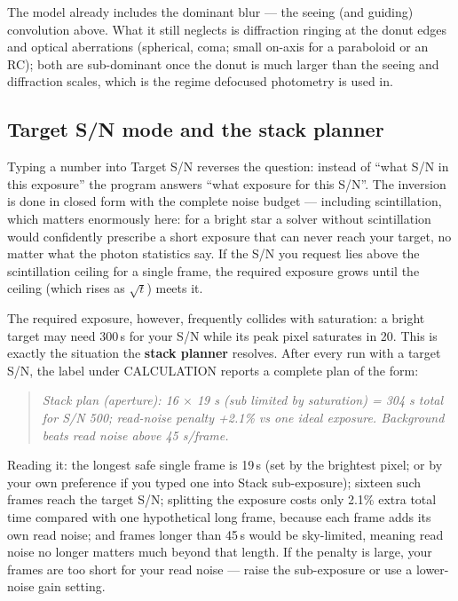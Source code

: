 The model already includes the dominant blur --- the seeing (and guiding)
convolution above. What it still neglects is diffraction ringing at the
donut edges and optical aberrations (spherical, coma; small on-axis for a
paraboloid or an RC); both are sub-dominant once the donut is much larger
than the seeing and diffraction scales, which is the regime defocused
photometry is used in.

\subsection{Target S/N mode and the stack planner}

Typing a number into \textsf{Target S/N} reverses the question: instead
of ``what S/N in this exposure'' the program answers ``what exposure for
this S/N''. The inversion is done in closed form with the complete noise
budget --- including scintillation, which matters enormously here: for a
bright star a solver without scintillation would confidently prescribe a
short exposure that can never reach your target, no matter what the
photon statistics say. If the S/N you request lies above the
scintillation ceiling for a single frame, the required exposure grows
until the ceiling (which rises as $\sqrt{t}$) meets it.

The required exposure, however, frequently collides with saturation: a
bright target may need 300\,s for your S/N while its peak pixel saturates
in 20. This is exactly the situation the \textbf{stack planner} resolves.
After every run with a target S/N, the label under CALCULATION reports a
complete plan of the form:

\begin{quote}
\emph{Stack plan (aperture): 16 $\times$ 19 s (sub limited by saturation)
= 304 s total for S/N 500; read-noise penalty +2.1\% vs one ideal
exposure. Background beats read noise above 45 s/frame.}
\end{quote}

Reading it: the longest safe single frame is 19\,s (set by the brightest
pixel; or by your own preference if you typed one into \textsf{Stack
sub-exposure}); sixteen such frames reach the target S/N; splitting the
exposure costs only 2.1\% extra total time compared with one
hypothetical long frame, because each frame adds its own read noise; and
frames longer than 45\,s would be sky-limited, meaning read noise no
longer matters much beyond that length. If the penalty is large, your
frames are too short for your read noise --- raise the sub-exposure or
use a lower-noise gain setting.

